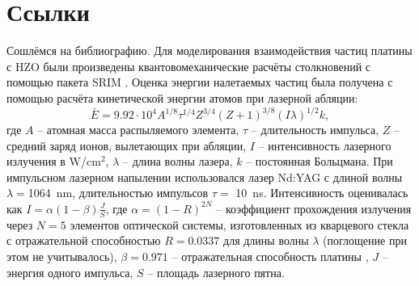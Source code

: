 \section{Ссылки}\label{sec:ch1/sec2}
Сошлёмся на библиографию.
Для моделирования взаимодействия частиц платины с HZO были произведены квантовомеханические расчёты столкновений с помощью пакета SRIM . Оценка энергии налетаемых частиц была получена с помощью расчёта кинетической энергии атомов при лазерной абляции:
\[\bar{E} = 9.92 \cdot 10^{4} A^{1/8} \tau^{1/4} Z^{3/4} (Z+1)^{3/8} (I\lambda)^{1/2}k,\] где \(A\) -- атомная масса распыляемого элемента, \(\tau\) -- длительность импульса, \(Z\) -- средний заряд ионов, вылетающих при абляции, \(I\) -- интенсивность лазерного излучения в \si{\watt}/\si{\cm}\(^2\), \(\lambda\) -- длина волны лазера, \(k\) -- постоянная Больцмана.
При импульсном лазерном напылении использовался лазер Nd:YAG с длиной волны \(\lambda=\)\SI{1064}{\nano\meter}, длительностью импульсов \(\tau=\) \SI{10}{\nano\second}. Интенсивность оценивалась как \(I=\alpha(1-\beta)\frac{J}{S}\), где \(\alpha=(1-R)^{2N}\) -- коэффициент прохождения излучения через \(N=5\) элементов оптической системы,
изготовленных из кварцевого стекла с отражательной способностью \(R=0.0337\) \cite{polyanskiyRefractiveindexInfoDatabase2024} для длины волны \(\lambda\) (поглощение при этом не учитывалось), \(\beta=0.971\) -- отражательная способность платины \cite{polyanskiyRefractiveindexInfoDatabase2024}, \(J\) -- энергия одного импульса, \(S\) -- площадь лазерного пятна.


